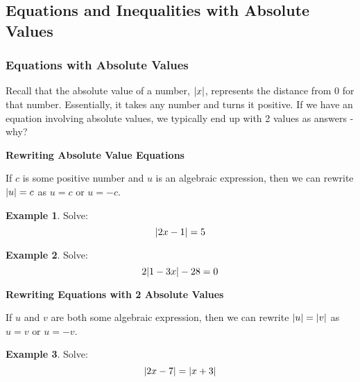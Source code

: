 \documentclass[addpoints,12pt]{exam}
\theoremstyle{definition}
\newtheorem{example}{Example}[subsection]
\begin{document}
\setcounter{section}{9}
\setcounter{subsection}{2}

\subsection{Equations and Inequalities with Absolute Values}

\subsubsection*{Equations with Absolute Values}

Recall that the absolute value of a number, $\abs{x}$, represents the distance from 0 for that number. Essentially, it takes any number and turns it positive. If we have an equation involving absolute values, we typically end up with 2 values as answers - why?
\vspace{.75in}

\begin{mdframed}
\textbf{Rewriting Absolute Value Equations}

If $c$ is some positive number and $u$ is an algebraic expression, then we can rewrite $\abs{u} = c$ as $u = c \text{ or } u = -c$.
\end{mdframed}

\vspace{.2in}
\begin{example}
Solve:
\[\abs{2x-1} = 5\]
\vspace{1.5in}
\end{example}

\begin{example}
Solve: \[2\abs{1-3x}-28 = 0\]
\vspace{1.5in}
\end{example}

\newpage

\begin{mdframed}
\textbf{Rewriting Equations with 2 Absolute Values}

If $u$ and $v$ are both some algebraic expression, then we can rewrite $\abs{u} = \abs{v}$ as $u = v \text{ or } u = -v$.
\end{mdframed}

\vspace{.2in}

\begin{example}
Solve: \[ \abs{2x-7} = \abs{x+3}\]
\vspace{2in}
\end{example}
\end{document}
